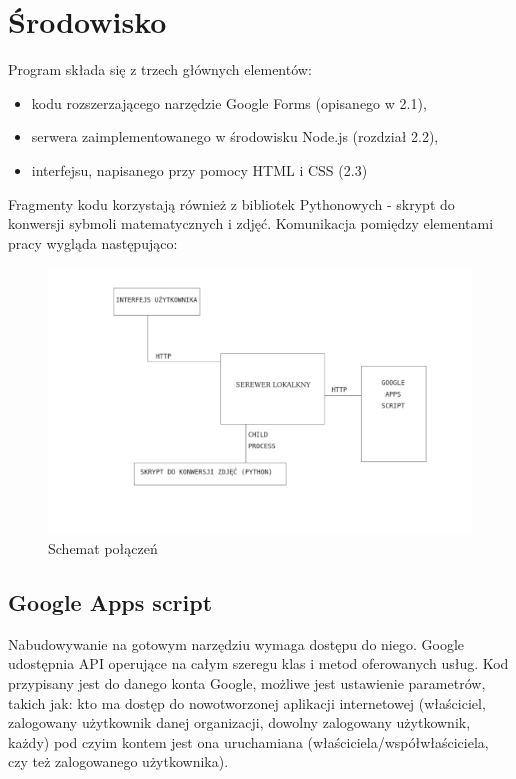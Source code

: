 \chapter{Środowisko}%
Program składa się z trzech głównych elementów:
\begin{itemize}
\item kodu rozszerzającego narzędzie Google Forms (opisanego w 2.1),
\item serwera zaimplementowanego w środowisku Node.js (rozdział 2.2),
\item interfejsu, napisanego przy pomocy HTML i CSS (2.3)
\end{itemize}
\ind Fragmenty kodu korzystają również z bibliotek Pythonowych - skrypt do konwersji sybmoli matematycznych i zdjęć.
\ind Komunikacja pomiędzy elementami pracy wygląda następująco:
\begin{figure}[H]
  \includegraphics{schemat.png}
  \caption{Schemat połączeń}
  \label{fig:1}
\end{figure}

\section{Google Apps script}
Nabudowywanie na gotowym narzędziu wymaga dostępu do niego. Google udostępnia API operujące na całym szeregu klas i metod oferowanych usług. Kod przypisany jest do danego konta Google, możliwe jest ustawienie parametrów,  takich  jak: kto ma dostęp do nowotworzonej aplikacji internetowej (właściciel, zalogowany użytkownik danej organizacji, dowolny zalogowany użytkownik, każdy) pod czyim kontem jest ona uruchamiana (właściciela/współwłaściciela, czy też zalogowanego użytkownika). 

